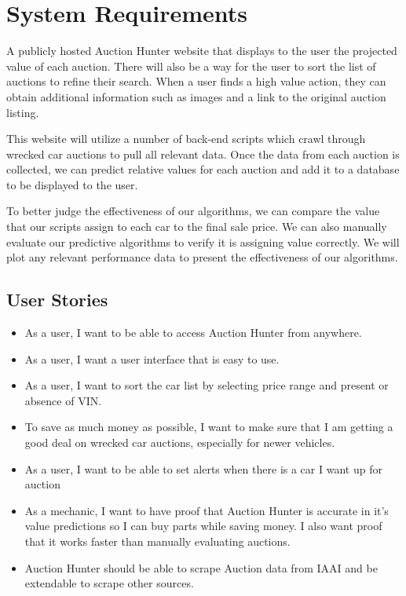 \documentclass[onecolumn, draftclsnofoot,10pt, compsoc]{IEEEtran}
\begin{document}
\section{System Requirements}
A publicly hosted Auction Hunter website that displays to the user the projected value of each auction. There will also be a way for the user to sort the list of auctions to refine their search. When a user finds a high value action, they can obtain additional information such as images and a link to the original auction listing. 

This website will utilize a number of back-end scripts which crawl through wrecked car auctions to pull all relevant data. Once the data from each auction is collected, we can predict relative values for each auction and add it to a database to be displayed to the user. 

To better judge the effectiveness of our algorithms, we can compare the value that our scripts assign to each car to the final sale price. We can also manually evaluate our predictive algorithms to verify it is assigning value correctly. We will plot any relevant performance data to present the effectiveness of our algorithms.  


\subsection{User Stories}
\begin{itemize}
\item As a user, I want to be able to access Auction Hunter from anywhere.
\item As a user, I want a user interface that is easy to use.
\item As a user, I want to sort the car list by selecting price range and present or absence of VIN. 
\item To save as much money as possible, I want to make sure that I am getting a good deal on wrecked car auctions, especially for newer vehicles.
\item As a user, I want to be able to set alerts when there is a car I want up for auction
\item As a mechanic, I want to have proof that Auction Hunter is accurate in it's value predictions so I can buy parts while saving money. I also want proof that it works faster than manually evaluating auctions.
\item Auction Hunter should be able to scrape Auction data from IAAI and be extendable to scrape other sources.
\end{itemize}
\end{document}
